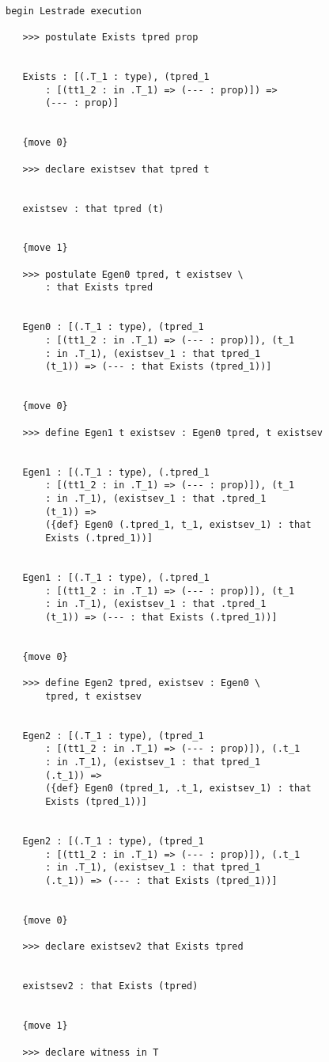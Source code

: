 \documentclass[12pt]{article}
\begin{document}
\begin{verbatim}

begin Lestrade execution

   >>> postulate Exists tpred prop


   Exists : [(.T_1 : type), (tpred_1 
       : [(tt1_2 : in .T_1) => (--- : prop)]) => 
       (--- : prop)]


   {move 0}

   >>> declare existsev that tpred t


   existsev : that tpred (t)


   {move 1}

   >>> postulate Egen0 tpred, t existsev \
       : that Exists tpred


   Egen0 : [(.T_1 : type), (tpred_1 
       : [(tt1_2 : in .T_1) => (--- : prop)]), (t_1 
       : in .T_1), (existsev_1 : that tpred_1 
       (t_1)) => (--- : that Exists (tpred_1))]


   {move 0}

   >>> define Egen1 t existsev : Egen0 tpred, t existsev


   Egen1 : [(.T_1 : type), (.tpred_1 
       : [(tt1_2 : in .T_1) => (--- : prop)]), (t_1 
       : in .T_1), (existsev_1 : that .tpred_1 
       (t_1)) => 
       ({def} Egen0 (.tpred_1, t_1, existsev_1) : that 
       Exists (.tpred_1))]


   Egen1 : [(.T_1 : type), (.tpred_1 
       : [(tt1_2 : in .T_1) => (--- : prop)]), (t_1 
       : in .T_1), (existsev_1 : that .tpred_1 
       (t_1)) => (--- : that Exists (.tpred_1))]


   {move 0}

   >>> define Egen2 tpred, existsev : Egen0 \
       tpred, t existsev


   Egen2 : [(.T_1 : type), (tpred_1 
       : [(tt1_2 : in .T_1) => (--- : prop)]), (.t_1 
       : in .T_1), (existsev_1 : that tpred_1 
       (.t_1)) => 
       ({def} Egen0 (tpred_1, .t_1, existsev_1) : that 
       Exists (tpred_1))]


   Egen2 : [(.T_1 : type), (tpred_1 
       : [(tt1_2 : in .T_1) => (--- : prop)]), (.t_1 
       : in .T_1), (existsev_1 : that tpred_1 
       (.t_1)) => (--- : that Exists (tpred_1))]


   {move 0}

   >>> declare existsev2 that Exists tpred


   existsev2 : that Exists (tpred)


   {move 1}

   >>> declare witness in T



\end{verbatim}
\end{document}
